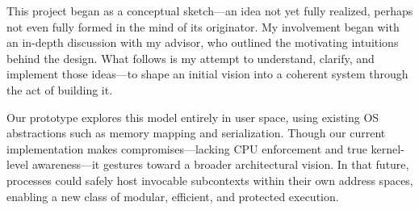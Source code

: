 This project began as a conceptual sketch—an idea not yet fully realized, perhaps not even fully formed in the mind of its originator. My involvement began with an in-depth discussion with my advisor, who outlined the motivating intuitions behind the design. What follows is my attempt to understand, clarify, and implement those ideas—to shape an initial vision into a coherent system through the act of building it.

Our prototype explores this model entirely in user space, using existing OS abstractions such as memory mapping and serialization. Though our current implementation makes compromises—lacking CPU enforcement and true kernel-level awareness—it gestures toward a broader architectural vision. In that future, processes could safely host invocable subcontexts within their own address spaces, enabling a new class of modular, efficient, and protected execution.